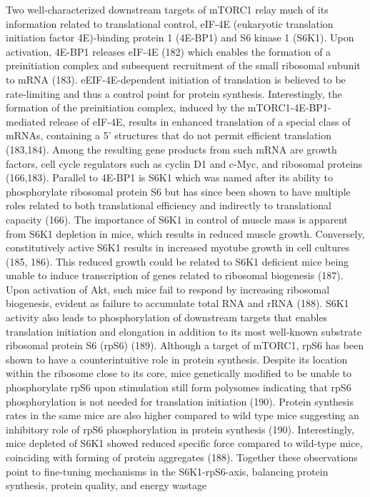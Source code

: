 \documentclass[twoside,10pt]{gihclass} %
\begin{document}
Two well-characterized downstream targets of mTORC1 relay much of its information related to translational control, eIF-4E (eukaryotic translation initiation factor 4E)-binding protein 1 (4E-BP1) and S6 kinase 1 (S6K1).
Upon activation, 4E-BP1 releases eIF-4E
(182)
which enables the formation of a preinitiation complex and subsequent recruitment of the small ribosomal subunit to mRNA
(183).
eEIF-4E-dependent initiation of translation is believed to be rate-limiting and thus a control point for protein synthesis.
Interestingly, the formation of the preinitiation complex, induced by the mTORC1-4E-BP1-mediated release of eIF-4E, results in enhanced translation of a special class of mRNAs, containing a 5' structures that do not permit efficient translation
(183,184).
Among the resulting gene products from such mRNA are growth factors, cell cycle regulators such as cyclin D1 and c-Myc, and ribosomal proteins
(166,183).
Parallel to 4E-BP1 is S6K1 which was named after its ability to phosphorylate ribosomal protein S6 but has since been shown to have multiple roles related to both translational efficiency and indirectly to translational capacity
(166).
The importance of S6K1 in control of muscle mass is apparent from S6K1 depletion in mice, which results in reduced muscle growth. Conversely, constitutively active S6K1 results in increased myotube growth in cell cultures
(185, 186).
This reduced growth could be related to S6K1 deficient mice being unable to induce transcription of genes related to ribosomal biogenesis
(187).
Upon activation of Akt, such mice fail to respond by increasing ribosomal biogenesis, evident as failure to accumulate total RNA and rRNA
(188).
S6K1 activity also leads to phosphorylation of downstream targets that enables translation initiation and elongation in addition to its most well-known substrate ribosomal protein S6 (rpS6)
(189).
Although a target of mTORC1, rpS6 has been shown to have a counterintuitive role in protein synthesis.
Despite its location within the ribosome close to its core, mice genetically modified to be unable to phosphorylate rpS6 upon stimulation still form polysomes indicating that rpS6 phosphorylation is not needed for translation initiation
(190).
Protein synthesis rates in the same mice are also higher compared to wild type mice suggesting an inhibitory role of rpS6 phosphorylation in protein synthesis
(190).
Interestingly, mice depleted of S6K1 showed reduced specific force compared to wild-type mice, coinciding with forming of protein aggregates
(188).
Together these observations point to fine-tuning mechanisms in the S6K1-rpS6-axis, balancing protein synthesis, protein quality, and energy wastage
\end{document}
